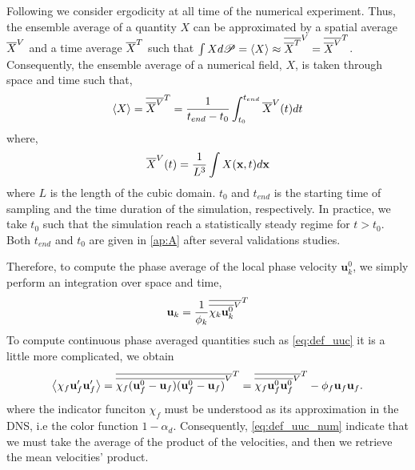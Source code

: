 Following \citet{du2022analysis} we consider ergodicity at all time of the numerical experiment.
Thus, the ensemble average of a quantity $X$ can be approximated by a spatial average $\overline{X}^V$ and a time average $\overline{X}^T$ such that $\int X d\mathscr{P} = \left<X\right> \approx \overline{\overline{X}^T}^V = \overline{\overline{X}^V}^T$.
Consequently, the ensemble average of a numerical field, $X$, is taken through space and time such that,
\begin{equation}
    \left<X\right>
    = \overline{\overline{X}^V}^T
    = \frac{1}{ t_{end} - t_0}\int_{t_0}^{t_{end}} 
    \overline{X}^V(t) dt
\end{equation}
where, 
\begin{equation}
    \overline{X}^V(t)
    = \frac{1}{L^3}\int 
    X(\textbf{x},t) d\textbf{x}
\end{equation}
where $L$ is the length of the cubic domain.
$t_0$ and $t_{end}$ is the starting time of sampling and the time duration of the simulation, respectively.
In practice, we take $t_0$ such that the simulation reach a statistically steady regime for $t>t_0$.  
Both $t_{end} $ and $t_0$ are given in \ref{ap:A} after several validations studies. 

Therefore, to compute the phase average of the local phase velocity $\textbf{u}_k^0$, we simply perform an integration over space and time, 
\begin{equation*}
    \textbf{u}_k = \frac{1}{\phi_k} \overline{\overline{\chi_k \textbf{u}_k^0}^V}^T
\end{equation*}
To compute continuous phase averaged quantities such as \ref{eq:def_uuc} it is a little more complicated, we obtain
\begin{equation}
    \avg{\chi_f\textbf{u}_f' \textbf{u}_f'}
    = \Tavg{\Xavg{\chi_f (\textbf{u}_f^0 -\textbf{u}_f ) (\textbf{u}_f^0 -\textbf{u}_f)}}
    = \Tavg{\Xavg{\chi_f \textbf{u}_f^0 \textbf{u}_f^0}}
    -  \phi_f  \textbf{u}_f \textbf{u}_f.
    \label{eq:def_uuf_num} 
\end{equation}
where the indicator funciton $\chi_f$ must be understood as its approximation in the DNS, i.e the color function $1 - \alpha_d$. 
Consequently, \ref{eq:def_uuc_num} indicate that we must take the average of the product of the velocities, and then we retrieve the mean velocities' product.  




